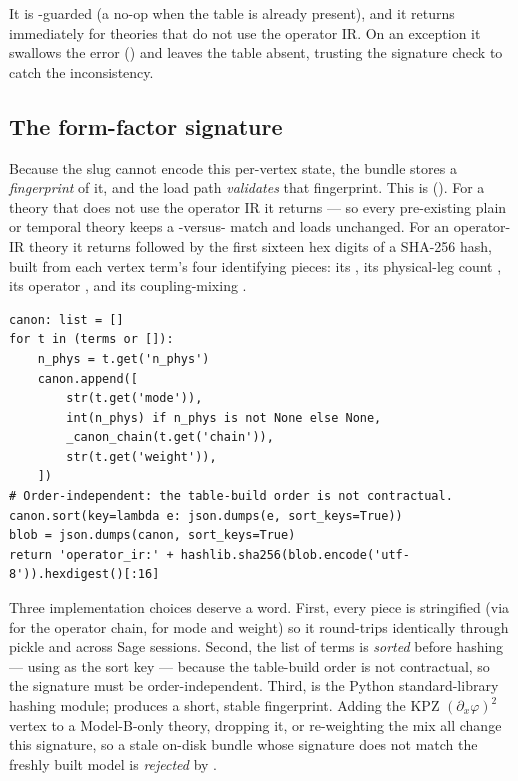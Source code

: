 It is -guarded (a no-op when the table is already present), and it
returns immediately for theories that do not use the operator IR. On an
exception it swallows the error () and leaves the table absent,
trusting the signature check to catch the inconsistency.

\subsection{The form-factor signature}

Because the slug cannot encode this per-vertex state, the bundle stores a
\emph{fingerprint} of it, and the load path \emph{validates} that fingerprint.
This is 
(). For a theory that does not use
the operator IR it returns  --- so every pre-existing plain or
temporal theory keeps a -versus- match and loads
unchanged. For an operator-IR theory it returns
 followed by the first sixteen hex digits of a SHA-256
hash, built from each vertex term's four identifying pieces: its ,
its physical-leg count , its operator , and its
coupling-mixing .

\begin{lstlisting}
canon: list = []
for t in (terms or []):
    n_phys = t.get('n_phys')
    canon.append([
        str(t.get('mode')),
        int(n_phys) if n_phys is not None else None,
        _canon_chain(t.get('chain')),
        str(t.get('weight')),
    ])
# Order-independent: the table-build order is not contractual.
canon.sort(key=lambda e: json.dumps(e, sort_keys=True))
blob = json.dumps(canon, sort_keys=True)
return 'operator_ir:' + hashlib.sha256(blob.encode('utf-8')).hexdigest()[:16]
\end{lstlisting}

Three implementation choices deserve a word. First, every piece is stringified
(via  for the operator chain,  for mode and
weight) so it round-trips identically through pickle and across Sage sessions.
Second, the list of terms is \emph{sorted} before hashing --- using
 as the sort key --- because the
table-build order is not contractual, so the signature must be
order-independent. Third,  is the Python standard-library hashing
module;  produces a short, stable
fingerprint. Adding the KPZ $(\partial_x\varphi)^2$ vertex to a Model-B-only
theory, dropping it, or re-weighting the mix all change this signature, so a
stale on-disk bundle whose signature does not match the freshly built model is
\emph{rejected} by .

